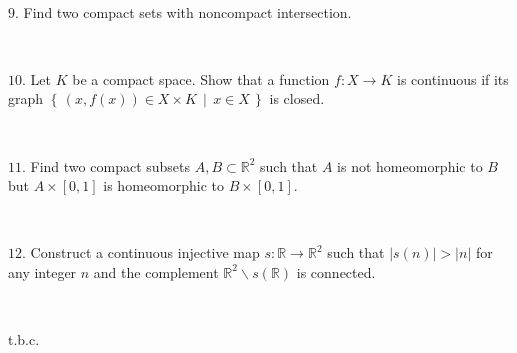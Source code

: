 \documentclass{article}
\def\noi{\noindent}%
\def\RR{\mathbb{R}}%
\def\i{\subset}
\def\:{\colon}
\newcommand{\set}[2]{\left\{\,#1\,\middle|\,#2\,\right\}}
\begin{document}
\ 

\noi $9.$ Find two compact sets with noncompact intersection.

\ 

\noi $10.$ Let $K$ be a compact space.
Show that a function $f\:X\to K$ is continuous if its graph $\set{(x,f(x))\in X\times K}{x\in X}$ is closed. 

\ 

\noi $11$. Find two compact subsets $A,B\i\RR^2$ such that 
$A$ is not homeomorphic to $B$ but $A\times[0,1]$ is homeomorphic to $B\times[0,1]$.

\ 

\noi $12$. Construct a continuous injective map $s\:\RR\to\RR^2$ such that $|s(n)|>|n|$ for any integer $n$ and the complement $\RR^2\backslash s(\RR)$ is connected. 

\ 

\noi t.b.c.
\end{document}
